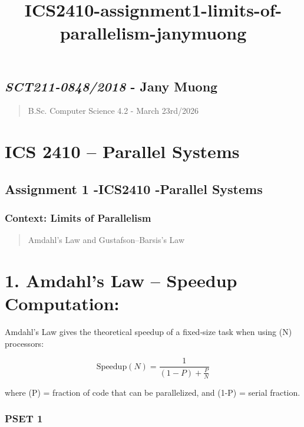 \documentclass[11pt]{article}
\title{ICS2410-assignment1-limits-of-parallelism-janymuong}
\begin{document}
    
    \maketitle
    
    

    
    \subsection{\texorpdfstring{\emph{SCT211-0848/2018} - Jany
Muong}{SCT211-0848/2018 - Jany Muong}}\label{sct211-08482018---jany-muong}

\begin{quote}
B.Sc. Computer Science 4.2 - March 23rd/2026
\end{quote}

\section{\texorpdfstring{\textbf{ICS 2410 -- Parallel
Systems}}{ICS 2410 -- Parallel Systems}}\label{ics-2410-parallel-systems}

\subsection{Assignment 1 -ICS2410 -Parallel
Systems}\label{assignment-1--ics2410--parallel-systems}

\subsubsection{Context: Limits of
Parallelism}\label{context-limits-of-parallelism}

\begin{quote}
Amdahl's Law and Gustafson--Barsis's Law
\end{quote}

    \section{1. Amdahl's Law -- Speedup
Computation:}\label{amdahls-law-speedup-computation}

Amdahl's Law gives the theoretical speedup of a fixed‑size task when
using (N) processors:

\[
\text{Speedup}(N) = \frac{1}{(1-P) + \frac{P}{N}}
\]

where (P) = fraction of code that can be parallelized, and (1-P) =
serial fraction.

\subsubsection{PSET 1}\label{pset-1}
\end{document}
